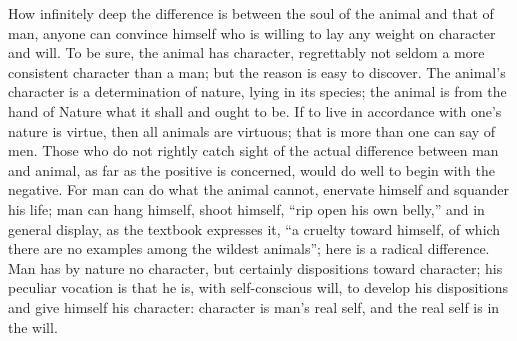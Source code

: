 \documentclass[12pt,a4paper,openany]{book}
\newcommand{\opage}[1]{\marginnote{\footnotesize\textit{[#1]}}}
\begin{document}
How infinitely deep the difference is between the soul of the animal and
that of man, anyone can convince himself who is willing to
lay any weight on character and will. To be sure, the animal has
character, regrettably not seldom a more consistent
character than a man; but the reason is easy to discover.
The animal's character is a determination of nature, lying
in its species; the animal is from the hand of Nature what it
shall and ought to be. If to live in accordance
with one's nature is virtue, then all animals are virtuous; that is
more than one can say of men. Those who do not
\setcounter{footnote}{0}%
\opage{494}rightly catch sight of the actual difference between
man and animal, as far as the positive is concerned, would do well to
begin with the negative. For man can do
what the animal cannot, enervate himself and squander his
life; man can hang himself, shoot himself, ``rip open his own
belly,'' and in general display, as the textbook expresses
it, ``a cruelty toward himself, of which
there are no examples among the wildest animals''; here is a
radical difference. Man has by nature no character,
but certainly dispositions toward character; his peculiar vocation
is that he is, with self-conscious will, to develop
his dispositions and give himself his character: character is
man's real self, and the real self is in the will.
\end{document}
